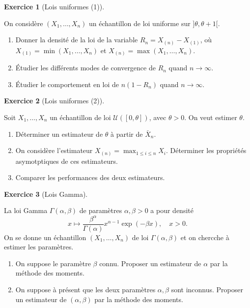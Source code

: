 \documentclass[
  10,
  letterpaper,
  DIV=11,
  numbers=noendperiod]{scrreport}
\providecommand{\tightlist}{%
  \setlength{\itemsep}{0pt}\setlength{\parskip}{0pt}}\usepackage{longtable,booktabs,array}
\theoremstyle{plain}
\theoremstyle{definition}
\newtheorem{exercise}{Exercice}[chapter]
\theoremstyle{plain}
\theoremstyle{definition}
\theoremstyle{definition}
\theoremstyle{plain}
\theoremstyle{remark}
\begin{document}
\begin{exercise}[Lois uniformes
(1)]\protect\hypertarget{exr-uniff1}{}\label{exr-uniff1}

On considère \((X_1, \dots, X_n)\) un échantillon de loi uniforme sur
\(]\theta, \theta+1[\).

\begin{enumerate}
\def\labelenumi{\arabic{enumi}.}
\tightlist
\item
  Donner la densité de la loi de la variable \(R_n=X_{(n)} -X_{(1)}\),
  où \(X_{(1)}=\min(X_1, \dots, X_n)\) et
  \(X_{(n)}=\max(X_1, \dots, X_n)\).
\item
  Étudier les différents modes de convergence de \(R_n\) quand
  \(n\to\infty\).
\item
  Étudier le comportement en loi de \(n(1-R_n)\) quand \(n\to\infty\).
\end{enumerate}

\end{exercise}

\begin{exercise}[Lois uniformes
(2)]\protect\hypertarget{exr-unif2}{}\label{exr-unif2}

Soit \(X_1,\dots,X_n\) un échantillon de loi
\(\mathscr{U}([0,\theta])\), avec \(\theta >0\). On veut estimer
\(\theta\).

\begin{enumerate}
\def\labelenumi{\arabic{enumi}.}
\tightlist
\item
  Déterminer un estimateur de \(\theta\) à partir de \(\bar{X}_n\).
\item
  On considère l'estimateur \(X_{(n)}= {\max}_{1\leq i \leq n}X_i\).
  Déterminer les propriétés asymotptiques de ces estimateurs.
\item
  Comparer les performances des deux estimateurs.
\end{enumerate}

\end{exercise}

\begin{exercise}[Lois
Gamma]\protect\hypertarget{exr-gamma}{}\label{exr-gamma}

La loi Gamma \(\Gamma(\alpha, \beta)\) de paramètres \(\alpha, \beta>0\)
a pour densité
\[ x\mapsto \frac{\beta^\alpha}{\Gamma(\alpha)}x^{\alpha-1}\exp(-\beta x), \quad x>0.\]
On se donne un échantillon \((X_1,\dots,X_n)\) de loi
\(\Gamma(\alpha, \beta)\) et on chercche à estimer les paramètres.

\begin{enumerate}
\def\labelenumi{\arabic{enumi}.}
\tightlist
\item
  On suppose le paramètre \(\beta\) connu. Proposer un estimateur de
  \(\alpha\) par la méthode des moments.
\item
  On suppose à présent que les deux paramètres \(\alpha, \beta\) sont
  inconnus. Proposer un estimateur de \((\alpha,\beta)\) par la méthode
  des moments.
\end{enumerate}

\end{exercise}
\end{document}
